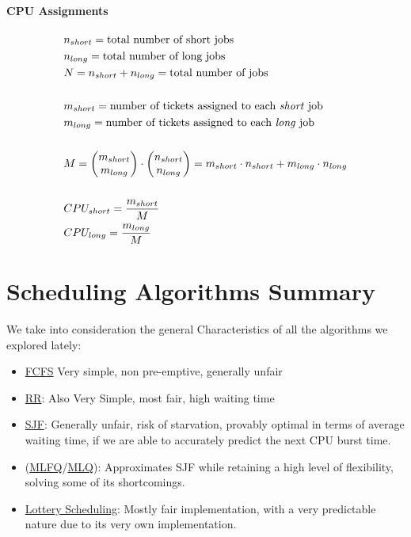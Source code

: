 \documentclass[openright, twoside]{report}
\theoremstyle{definition}
\theoremstyle{example}
\begin{document}
			\paragraph{CPU Assignments}
			\begin{align*}
				&n_{short} = \text{total number of short jobs}\\
				&n_{long} = \text{total number of long jobs}\\
				&N = n_{short} + n_{long} = \text{total number of jobs}\\
				&\;\\
				&m_{short} = \text{number of tickets assigned to each \emph{short} job}\\
				&m_{long} = \text{number of tickets assigned to each \emph{long} job}\\
				&\;\\
				&M = \begin{pmatrix}m_{short} \\ m_{long}\end{pmatrix} \cdot \begin{pmatrix}n_{short} \\ n_{long}\end{pmatrix} = m_{short} \cdot n_{short} + m_{long} \cdot n_{long}\\
				&\;\\
				&CPU_{short} = \frac{m_{short}}{M}\\
				&CPU_{long} = \frac{m_{long}}{M}
			\end{align*}

			

	\section{Scheduling Algorithms Summary}
	We take into consideration the general Characteristics of all the 
	algorithms we explored lately:
	\begin{itemize}
		\item \hyperref[ssec:FCFS]{FCFS} Very simple, non pre-emptive, generally unfair
		\item \hyperref[ssec:RR]{RR}: Also Very Simple, most fair, high waiting time
		\item \hyperref[ssec:SJF]{SJF}: Generally unfair, risk of starvation, provably
		optimal in terms of average waiting time, if we are able to accurately predict
		the next CPU burst time.
		\item (\hyperref[ssec:MLFQ]{MLFQ}/\hyperref[ssec:MLQ]{MLQ}): Approximates SJF
		while retaining a high level of flexibility, solving some of its shortcomings.
		\item \hyperref[ssec:lottery]{Lottery Scheduling}: Mostly fair implementation,
		with a very predictable nature due to its very own implementation.
		
	\end{itemize}
	
\end{document}
